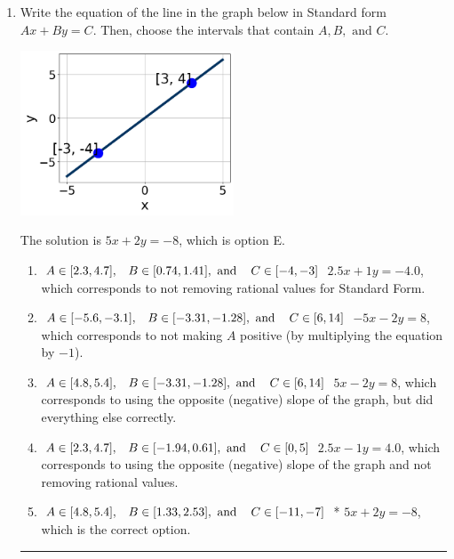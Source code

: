 \documentclass{extbook}[14pt]
\newcommand{\litem}[1]{\item #1

\rule{\textwidth}{0.4pt}}
\begin{document}
\begin{enumerate}\litem{
Write the equation of the line in the graph below in Standard form $Ax+By=C$. Then, choose the intervals that contain $A, B, \text{ and } C$.

\begin{center}
    \includegraphics[width=0.5\textwidth]{../Figures/linearGraphToStandardB.png}
\end{center}

The solution is \( 5x + 2y = -8 \), which is option E.\begin{enumerate}[label=\Alph*.]
\item \( A \in [2.3, 4.7], \hspace{3mm} B \in [0.74, 1.41], \text{ and } \hspace{3mm} C \in [-4, -3] \)
 $2.5x + 1y = -4.0$, which corresponds to not removing rational values for Standard Form.
\item \( A \in [-5.6, -3.1], \hspace{3mm} B \in [-3.31, -1.28], \text{ and } \hspace{3mm} C \in [6, 14] \)
 $-5x - 2y = 8$, which corresponds to not making $A$ positive (by multiplying the equation by $-1$).
\item \( A \in [4.8, 5.4], \hspace{3mm} B \in [-3.31, -1.28], \text{ and } \hspace{3mm} C \in [6, 14] \)
 $5x - 2y = 8$, which corresponds to using the opposite (negative) slope of the graph, but did everything else correctly.
\item \( A \in [2.3, 4.7], \hspace{3mm} B \in [-1.94, 0.61], \text{ and } \hspace{3mm} C \in [0, 5] \)
 $2.5x - 1y = 4.0$, which corresponds to using the opposite (negative) slope of the graph and not removing rational values.
\item \( A \in [4.8, 5.4], \hspace{3mm} B \in [1.33, 2.53], \text{ and } \hspace{3mm} C \in [-11, -7] \)
* $5x + 2y = -8$, which is the correct option.
\end{enumerate}

}
\end{enumerate}
\end{document}
